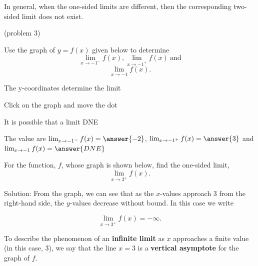 \documentclass[handout]{ximera}
\begin{document}
In general, when the one-sided limits are different, then the 
corresponding two-sided limit does not exist.

\begin{problem}(problem 3)


  Use the graph of $y = f(x)$ given below to determine
  \[
  \lim_{x\to -1^-} f(x), \lim_{x\to -1^+} f(x) \ \text{and}
	\]
	\[
	\lim_{x\to -1} f(x).
	\]
  
  
    \begin{hint}
      The y-coordinates determine the limit
    \end{hint}
		\begin{hint}
		  Click on the graph and move the dot
		\end{hint}
		\begin{hint}
		  It is possible that a limit DNE
		\end{hint}
		The value are $\lim_{x\to -1^-} f(x)=\answer{-2}$, 
		$\lim_{x\to -1^+} f(x)=\answer{3}$ and 
		$\lim_{x\to -1} f(x)=\answer{DNE}$



	
\end{problem}


\begin{example}[example 4]
For the function, $f$, whose graph is shown below, find the one-sided limit,
\[
\lim_{x \to 3^+}f(x).
\]




\vspace{.25in}
Solution: From the graph, we can see that as the $x$-values approach 3 from the right-hand side, the $y$-values decrease without bound.  In this case we write

\[
\lim_{x \to 3^+}f(x) = -\infty.
\]

To describe the phenomenon of an \textbf{infinite limit} as $x$ approaches a finite value (in this case, 3), 
we say that the line $x = 3$ is a \textbf{vertical asymptote} for the graph of $f$.

\end{example}
\end{document}
